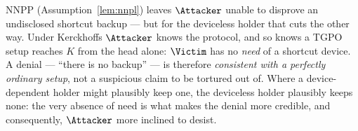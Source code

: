 \begin{remark}\label{rem:plausible-denial}
NNPP (Assumption~\ref{lem:nnpl}) leaves $\Attacker$ unable to disprove an undisclosed
shortcut backup --- but for the deviceless holder that cuts the other way. Under
Kerckhoffs $\Attacker$ knows the protocol, and so knows a TGPO setup reaches $K$ from
the head alone: $\Victim$ has no \emph{need} of a shortcut device. A denial ---
``there is no backup'' --- is therefore \emph{consistent with a perfectly ordinary
setup}, not a suspicious claim to be tortured out of. Where a device-dependent holder
might plausibly keep one, the deviceless holder plausibly keeps none: the very
absence of need is what makes the denial more credible, and consequently, $\Attacker$ 
more inclined to desist.
\end{remark}
